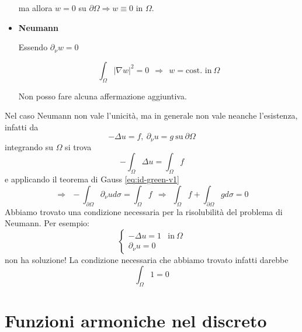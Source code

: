 \documentclass[10pt,a4paper,twoside,openright]{book}
\begin{document}
\begin{dimostrazione}
\begin{itemize}
		      ma allora $\displaystyle w=0$ su $\displaystyle \partial \Omega \Rightarrow w\equiv 0$ in $\displaystyle \Omega $.
		\item \textbf{Neumann}
		      
		      Essendo $\displaystyle \partial _{\nu } w=0$
		      
		      \begin{equation*}
		      	\int _{\Omega }| \nabla w| ^{2} =0\ \ \Rightarrow \ \ w=\text{cost. in} \ \Omega 
		      \end{equation*}
		      
		      Non posso fare alcuna affermazione aggiuntiva.
	\end{itemize}
\end{dimostrazione}
Nel caso Neumann non vale l'unicità, ma in generale non vale neanche l'esistenza, infatti da 
\begin{equation*}
	-\Delta u=f,\ \partial _{\nu } u=g\ \text{su} \ \partial \Omega 
\end{equation*}
integrando su $\displaystyle \Omega $ si trova
\begin{equation*}
	-\int _{\Omega } \Delta u=\int _{\Omega } f
\end{equation*}
e applicando il teorema di Gauss \eqref{eq:id-green-v1}
\begin{equation*}
	\Rightarrow \ \ -\int _{\partial \Omega } \partial _{\nu } ud\sigma =\int _{\Omega } f\ \ \Rightarrow \ \ \boxed{\int _{\Omega } f+\int _{\partial \Omega } gd\sigma =0}
\end{equation*}
Abbiamo trovato una condizione necessaria per la risolubilità del problema di Neumann. Per esempio:
\begin{equation*}
	\begin{cases}
		-\Delta u=1          & \text{in} \ \Omega \\
		\partial _{\nu } u=0 &                    
	\end{cases}
\end{equation*}
non ha soluzione! La condizione necessaria che abbiamo trovato infatti darebbe
\begin{equation*}
	\int _{\Omega } 1=0
\end{equation*}
\section{Funzioni armoniche nel discreto}
\end{document}
